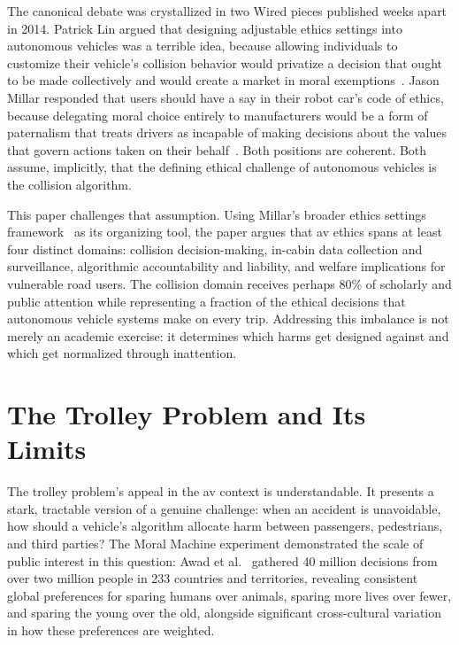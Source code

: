 \documentclass{ieee-portfolio}
\begin{document}
The canonical debate was crystallized in two Wired pieces published weeks apart in 2014. Patrick Lin argued that designing adjustable ethics settings into autonomous vehicles was a terrible idea, because allowing individuals to customize their vehicle's collision behavior would privatize a decision that ought to be made collectively and would create a market in moral exemptions~\cite{lin_heres_2014}. Jason Millar responded that users should have a say in their robot car's code of ethics, because delegating moral choice entirely to manufacturers would be a form of paternalism that treats drivers as incapable of making decisions about the values that govern actions taken on their behalf~\cite{millar_you_2014}. Both positions are coherent. Both assume, implicitly, that the defining ethical challenge of autonomous vehicles is the collision algorithm.
 
This paper challenges that assumption. Using Millar's broader ethics settings framework~\cite{millar_ethics_2017} as its organizing tool, the paper argues that \gls{av} ethics spans at least four distinct domains: collision decision-making, in-cabin data collection and surveillance, algorithmic accountability and liability, and welfare implications for vulnerable road users. The collision domain receives perhaps 80\% of scholarly and public attention while representing a fraction of the ethical decisions that autonomous vehicle systems make on every trip. Addressing this imbalance is not merely an academic exercise: it determines which harms get designed against and which get normalized through inattention.
 
\section{The Trolley Problem and Its Limits}
 
The trolley problem's appeal in the \gls{av} context is understandable. It presents a stark, tractable version of a genuine challenge: when an accident is unavoidable, how should a vehicle's algorithm allocate harm between passengers, pedestrians, and third parties? The Moral Machine experiment demonstrated the scale of public interest in this question: Awad et al.~\cite{awad_moral_2018} gathered 40 million decisions from over two million people in 233 countries and territories, revealing consistent global preferences for sparing humans over animals, sparing more lives over fewer, and sparing the young over the old, alongside significant cross-cultural variation in how these preferences are weighted.
 
\end{document}

